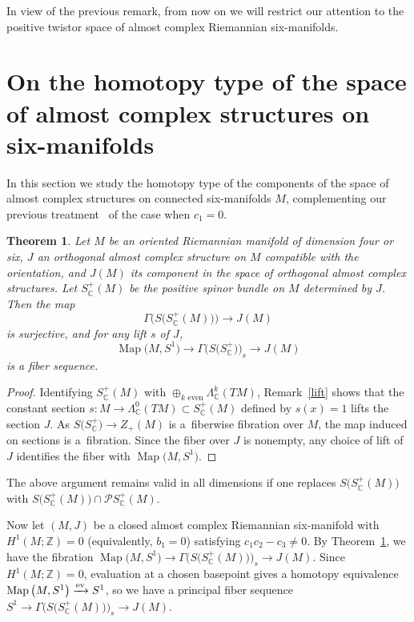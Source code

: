 \documentclass[pdftex]{sigma}%
\newcommand{\ZZ}{\mathbb{Z}}
\newcommand{\C}{\mathbb{C}}
\DeclareMathOperator{\Map}{Map}
\numberwithin{equation}{section}
\newtheorem{Theorem}{Theorem}[section]
\begin{document}
In view of the previous remark, from now on we will restrict our attention to the positive twistor space of almost complex Riemannian six-manifolds.

\section[On the homotopy type of the space of almost complex structures on six-manifolds]{On the homotopy type of the space\\ of almost complex structures on six-manifolds}

In this section we study the homotopy type of the components of the space of almost complex structures on connected six-manifolds $M$, complementing our previous treatment~\cite{FGM21} of the case when $c_1=0$.

\begin{Theorem}\label{fibration}
Let $M$ be an oriented Riemannian manifold of dimension four or six, $J$ an orthogonal almost complex structure on $M$ compatible with the orientation, and $J(M)$ its component in the space of orthogonal almost complex structures. Let $S_{\C}^+(M)$ be the positive spinor bundle on $M$ determined by $J$. Then the map
\[
\Gamma\big( S\big(S_\C^+(M)\big)\big) \to J(M)
\]
is surjective, and for any lift $s$ of $J$,
\[
\Map\big(M,S^1\big) \to \Gamma\big( S\big(S_\C^+\big)\big)_s \to J(M)
\]
is a fiber sequence.
\end{Theorem}
\begin{proof}
Identifying $S_\C^+(M)$ with $\oplus_{k \text{ even}} \Lambda^k_\C(TM)$, Remark~\ref{lift} shows that
the constant section $s \colon M \to \Lambda^0_\C(TM) \subset S_\C^+(M)$ defined by
$s(x)=1$ lifts the section $J$. As $S\big(S_\C^+\big) \to Z_+(M)$ is a~fiberwise fibration over $M$, the map induced on sections is a~fibration. Since the fiber over $J$ is nonempty, any choice of lift of $J$ identifies the
fiber with $\Map\big(M,S^1\big)$.
\end{proof}

\begin{Remark} The above argument remains valid in all dimensions if one replaces $S\big(S_{\C}^+(M)\big)$ with $S\big(S_{\C}^+(M)\big) \cap {\mathcal P}S ^+_{\C}(M)$. \end{Remark}

Now let $(M,J)$ be a closed almost complex Riemannian six-manifold with $H^1(M;\ZZ) = 0$ (equivalently, $b_1 = 0$) satisfying $c_1c_2 - c_3 \neq 0$. By Theorem~\ref{fibration}, we have the fibration $\Map\big(M,S^1\big) \to \Gamma\big( S\big(S_\C^+(M)\big)\big)_s \to J(M)$. Since $H^1(M;\ZZ) = 0$, evaluation at a chosen basepoint gives a homotopy equivalence $\Map\big(M,S^1\big) \xrightarrow{{\rm ev}} S^1$, so we have a principal fiber sequence $S^1 \to \Gamma\big(S\big(S_\C^+(M)\big)\big)_s \to J(M)$.
\end{document}
